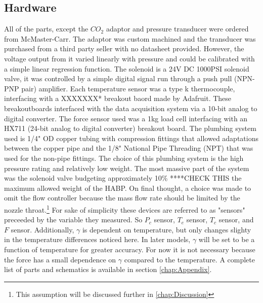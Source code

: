\subsection{Hardware}
All of the parts, except the $CO_2$ adaptor and pressure transducer were ordered from McMaster-Carr. The adaptor was custom machined and the transducer was purchased from a third party seller with no datasheet provided. However, the voltage output from it varied linearly with pressure and could be calibrated with a simple linear regression function. The solenoid is a 24V DC 1000PSI solenoid valve, it was controlled by a simple digital signal run through a push pull (NPN-PNP pair) amplifier. Each temperature sensor was a type k thermocouple, interfacing with a XXXXXXX* breakout baord made by Adafruit. These breakoutboards interfaced with the data acquisition system via a 10-bit analog to digital converter. The force sensor used was a 1kg load cell interfacing with an HX711 (24-bit analog to digital converter) breakout board. The plumbing system used is 1/4" OD copper tubing with compression fittings that allowed adaptations between the copper pipe and the 1/8" National Pipe Threading (NPT) that was used for the non-pipe fittings. The choice of this plumbing system is the high pressure rating and relatively low weight. The most massive part of the system was the solenoid valve budgeting approximately 10\% ****CHECK THIS the maximum allowed weight of the HABP. On final thought, a choice was made to omit the flow controller because the mass flow rate should be limited by the nozzle throat.\footnote{This assumption will be discussed further in \ref{chap:Discussion}} For sake of simplicity these devices are referred to as "sensors" preceeded by the variable they measured. So $P_c$ sensor, $T_e$ sensor, $T_c$ sensor, and $F$ sensor. Additionally, $\gamma$ is dependent on temperature, but only changes slighty in the temperature differences noticed here. In later models, $\gamma$ will be set to be a function of temperature for greater accuracy. For now it is not necessary because the force has a small dependence on $\gamma$ compared to the temperature. A complete list of parts and schematics is available in section \ref{chap:Appendix}.
